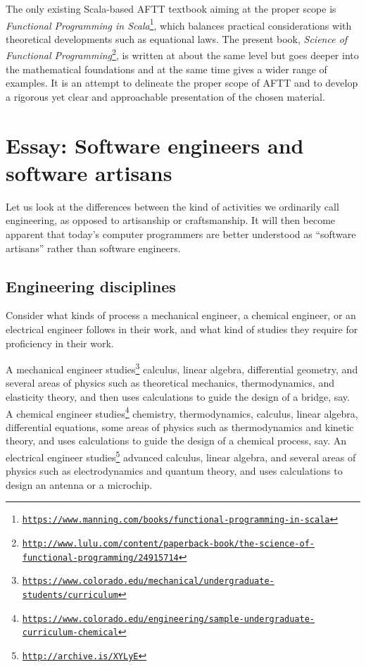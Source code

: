 The only existing Scala-based AFTT textbook aiming at the proper scope
is \emph{Functional Programming in Scala}\footnote{\texttt{\href{https://www.manning.com/books/functional-programming-in-scala}{https://www.manning.com/books/functional-programming-in-scala}}},
which balances practical considerations with theoretical developments
such as equational laws. The present book, \emph{Science of Functional
Programming}\footnote{\texttt{\href{http://www.lulu.com/content/paperback-book/the-science-of-functional-programming/24915714}{http://www.lulu.com/content/paperback-book/the-science-of-functional-programming/24915714}}},
is written at about the same level but goes deeper into the mathematical
foundations and at the same time gives a wider range of examples.
It is an attempt to delineate the proper scope of AFTT and to develop
a rigorous yet clear and approachable presentation of the chosen material. 

\chapter{Essay: Software engineers and software artisans}

Let us look at the differences between the kind of activities we ordinarily
call engineering, as opposed to artisanship or craftsmanship. It will
then become apparent that today's computer programmers are better
understood as ``software artisans'' rather than software engineers.

\section{Engineering disciplines }

Consider what kinds of process a mechanical engineer, a chemical engineer,
or an electrical engineer follows in their work, and what kind of
studies they require for proficiency in their work.

A mechanical engineer studies\footnote{\texttt{\href{https://www.colorado.edu/mechanical/undergraduate-students/curriculum}{https://www.colorado.edu/mechanical/undergraduate-students/curriculum}}}
calculus, linear algebra, differential geometry, and several areas
of physics such as theoretical mechanics, thermodynamics, and elasticity
theory, and then uses calculations to guide the design of a bridge,
say. A chemical engineer studies\footnote{\texttt{\href{https://www.colorado.edu/engineering/sample-undergraduate-curriculum-chemical}{https://www.colorado.edu/engineering/sample-undergraduate-curriculum-chemical}}}
chemistry, thermodynamics, calculus, linear algebra, differential
equations, some areas of physics such as thermodynamics and kinetic
theory, and uses calculations to guide the design of a chemical process,
say. An electrical engineer studies\footnote{\texttt{\href{http://archive.is/XYLyE}{http://archive.is/XYLyE}}}
advanced calculus, linear algebra, and several areas of physics such
as electrodynamics and quantum theory, and uses calculations to design
an antenna or a microchip.

